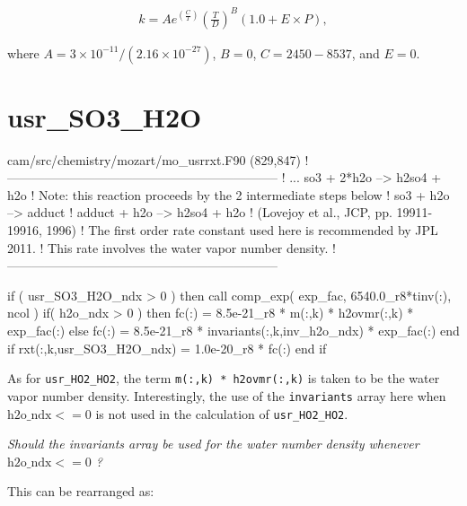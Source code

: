 \documentclass[titlepage]{article}
\begin{document}
\begin{equation}
\begin{split}
k = Ae^{(\frac{C}{T})}(\frac{T}{D})^B(1.0+E \times P),
\end{split}
\end{equation}

\noindent where $A = 3 \times 10^{-11} / \left(2.16 \times 10^{-27}\right)$, $B = 0$, $C = 2450 - 8537$, and $E = 0$.


\section{usr\_SO3\_H2O}

\begin{blockcode}[commandchars=\\\{\}]
\color{gray}cam/src/chemistry/mozart/mo_usrrxt.F90 (829,847)
!-----------------------------------------------------------------
!       ... so3 + 2*h2o --> h2so4 + h2o
!       Note: this reaction proceeds by the 2 intermediate steps below
!           so3 + h2o --> adduct
!           adduct + h2o --> h2so4 + h2o
!               (Lovejoy et al., JCP, pp. 19911-19916, 1996)
! The first order rate constant used here is recommended by JPL 2011.
! This rate involves the water vapor number density.
!-----------------------------------------------------------------

       if ( usr_SO3_H2O_ndx > 0 ) then
          call comp_exp( exp_fac, 6540.0_r8*tinv(:), ncol )
          if( h2o_ndx > 0 ) then
             fc(:) = 8.5e-21_r8 * m(:,k) * h2ovmr(:,k) * exp_fac(:)
          else
             fc(:) = 8.5e-21_r8 * invariants(:,k,inv_h2o_ndx) * exp_fac(:)
          end if
          rxt(:,k,usr_SO3_H2O_ndx) = 1.0e-20_r8 * fc(:)
       end if
\end{blockcode}

As for \verb>usr_HO2_HO2>, the term \verb>m(:,k) * h2ovmr(:,k)> is taken to be the water vapor number density. Interestingly, the use of the \verb>invariants> array here when $\mbox{h2o\_ndx} <= 0$ is not used in the calculation of \verb>usr_HO2_HO2>.
\vspace{20px}

\textit{\Large Should the invariants array be used for the water number density whenever $\mbox{h2o\_ndx} <= 0$ ?}

\vspace{20px}
This can be rearranged as:
\vspace{20px}
\end{document}
